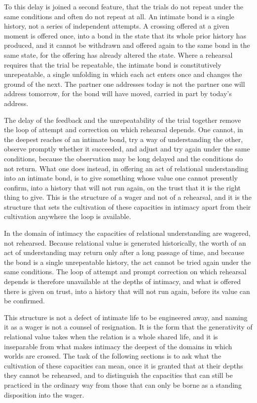 To this delay is joined a second feature, that the trials do not repeat under the same conditions and often do not repeat at all. An intimate bond is a single history, not a series of independent attempts. A crossing offered at a given moment is offered once, into a bond in the state that its whole prior history has produced, and it cannot be withdrawn and offered again to the same bond in the same state, for the offering has already altered the state. Where a rehearsal requires that the trial be repeatable, the intimate bond is constitutively unrepeatable, a single unfolding in which each act enters once and changes the ground of the next. The partner one addresses today is not the partner one will address tomorrow, for the bond will have moved, carried in part by today's address.

The delay of the feedback and the unrepeatability of the trial together remove the loop of attempt and correction on which rehearsal depends. One cannot, in the deepest reaches of an intimate bond, try a way of understanding the other, observe promptly whether it succeeded, and adjust and try again under the same conditions, because the observation may be long delayed and the conditions do not return. What one does instead, in offering an act of relational understanding into an intimate bond, is to give something whose value one cannot presently confirm, into a history that will not run again, on the trust that it is the right thing to give. This is the structure of a wager and not of a rehearsal, and it is the structure that sets the cultivation of these capacities in intimacy apart from their cultivation anywhere the loop is available.

\begin{claim}
In the domain of intimacy the capacities of relational understanding are wagered, not rehearsed. Because relational value is generated historically, the worth of an act of understanding may return only after a long passage of time, and because the bond is a single unrepeatable history, the act cannot be tried again under the same conditions. The loop of attempt and prompt correction on which rehearsal depends is therefore unavailable at the depths of intimacy, and what is offered there is given on trust, into a history that will not run again, before its value can be confirmed.
\end{claim}

This structure is not a defect of intimate life to be engineered away, and naming it as a wager is not a counsel of resignation. It is the form that the generativity of relational value takes when the relation is a whole shared life, and it is inseparable from what makes intimacy the deepest of the domains in which worlds are crossed. The task of the following sections is to ask what the cultivation of these capacities can mean, once it is granted that at their depths they cannot be rehearsed, and to distinguish the capacities that can still be practiced in the ordinary way from those that can only be borne as a standing disposition into the wager.
